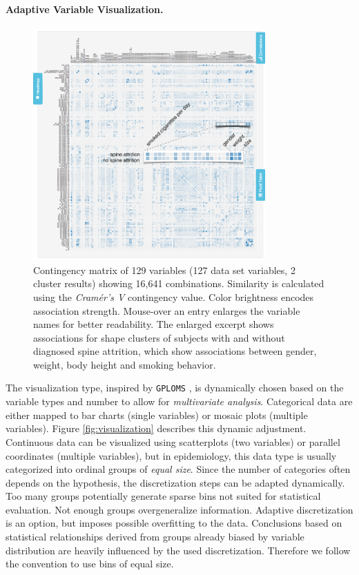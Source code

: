 \documentclass[journal]{style/vgtc} 			          %
\begin{document}
\paragraph{Adaptive Variable Visualization.} \label{sec:AdaptiveFeatureVisualization}
\begin{figure}[htb]
 \centering
 \includegraphics[width=3.5in]{figures/similarity_matrix}
 \caption{Contingency matrix of 129 variables (127 data set variables, 2 cluster results) showing 16,641 combinations.
 Similarity is calculated using the \emph{Cram\'{e}r's V} contingency value.
 Color brightness encodes association strength.
 Mouse-over an entry enlarges the variable names for better readability.
 The enlarged excerpt shows associations for shape clusters of subjects with and without diagnosed spine attrition, which show associations between gender, weight, body height and smoking behavior.
 }
 \label{fig:similarity}
\end{figure}
The visualization type, inspired by \texttt{GPLOMS} \cite{GPLOMS, Francois2013}, is dynamically chosen based on the variable types and number to allow for \emph{multivariate analysis}.
%
Categorical data are either mapped to bar charts (single variables) or mosaic plots (multiple variables).
%
Figure \ref{fig:visualization} describes this dynamic adjustment.
%
Continuous data can be visualized using scatterplots (two variables) or parallel coordinates (multiple variables), but in epidemiology, this data type is usually categorized into ordinal groups of \emph{equal size}.
%
Since the number of categories often depends on the hypothesis, the discretization steps can be adapted dynamically.
%
Too many groups potentially generate sparse bins not suited for statistical evaluation.
%
Not enough groups overgeneralize information.
%
Adaptive discretization is an option, but imposes possible overfitting to the data.
%
Conclusions based on statistical relationships derived from groups already biased by variable distribution are heavily influenced by the used discretization.
%
Therefore we follow the convention to use bins of equal size.
\end{document}
